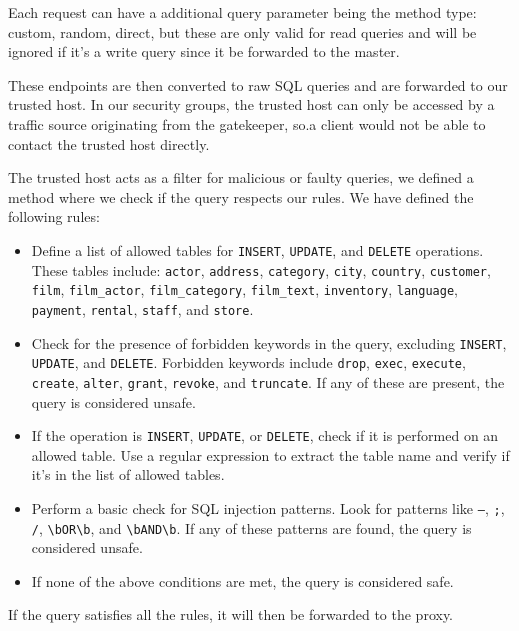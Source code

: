 \documentclass[11pt]{article}
\begin{document}
\newline
Each request can have a additional query parameter being the method type: custom, random, direct, but these are only valid for read queries and will be ignored if it's a write query since it be forwarded to the master.

\noindent
These endpoints are then converted to raw SQL queries and are forwarded to our trusted host. In our security groups, the trusted host can only be accessed by a traffic source originating from the gatekeeper, so.a client would not be able to contact the trusted host directly.
\newline

The trusted host acts as a filter for malicious or faulty queries, we defined a method where we check if the query respects our rules. We have defined the following rules:
\begin{itemize}
    \item Define a list of allowed tables for \texttt{INSERT}, \texttt{UPDATE}, and \texttt{DELETE} operations. These tables include: \texttt{actor}, \texttt{address}, \texttt{category}, \texttt{city}, \texttt{country}, \texttt{customer}, \texttt{film}, \texttt{film\_actor}, \texttt{film\_category}, \texttt{film\_text}, \texttt{inventory}, \texttt{language}, \texttt{payment}, \texttt{rental}, \texttt{staff}, and \texttt{store}.
    \item Check for the presence of forbidden keywords in the query, excluding \texttt{INSERT}, \texttt{UPDATE}, and \texttt{DELETE}. Forbidden keywords include \texttt{drop}, \texttt{exec}, \texttt{execute}, \texttt{create}, \texttt{alter}, \texttt{grant}, \texttt{revoke}, and \texttt{truncate}. If any of these are present, the query is considered unsafe.
    \item If the operation is \texttt{INSERT}, \texttt{UPDATE}, or \texttt{DELETE}, check if it is performed on an allowed table. Use a regular expression to extract the table name and verify if it's in the list of allowed tables.
    \item Perform a basic check for SQL injection patterns. Look for patterns like \texttt{--}, \texttt{;}, \texttt{/\*}, \texttt{\textbackslash bOR\textbackslash b}, and \texttt{\textbackslash bAND\textbackslash b}. If any of these patterns are found, the query is considered unsafe.
    \item If none of the above conditions are met, the query is considered safe.
\end{itemize}
If the query satisfies all the rules, it will then be forwarded to the proxy.
\newline
\end{document}
